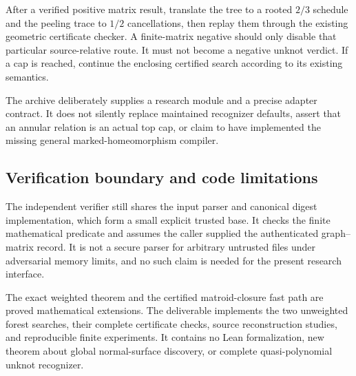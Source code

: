 After a verified positive matrix result, translate the tree to a rooted
$2/3$ schedule and the peeling trace to $1/2$ cancellations, then replay
them through the existing geometric certificate checker. A finite-matrix
negative should only disable that particular source-relative route.
It must not become a negative unknot verdict. If a cap is reached, continue
the enclosing certified search according to its existing semantics.

The archive deliberately supplies a research module and a precise adapter
contract. It does not silently replace maintained recognizer defaults,
assert that an annular relation is an actual top cap, or claim to have
implemented the missing general marked-homeomorphism compiler.

\subsection{Verification boundary and code limitations}

The independent verifier still shares the input parser and canonical
digest implementation, which form a small explicit trusted base. It checks
the finite mathematical predicate and assumes the caller supplied the
authenticated graph--matrix record. It is not a secure parser for arbitrary
untrusted files under adversarial memory limits, and no such claim is
needed for the present research interface.

The exact weighted theorem and the certified matroid-closure fast path are
proved mathematical extensions. The deliverable implements the two
unweighted forest searches, their complete certificate checks, source
reconstruction studies, and reproducible finite experiments. It contains
no Lean formalization, new theorem about global normal-surface discovery,
or complete quasi-polynomial unknot recognizer.
